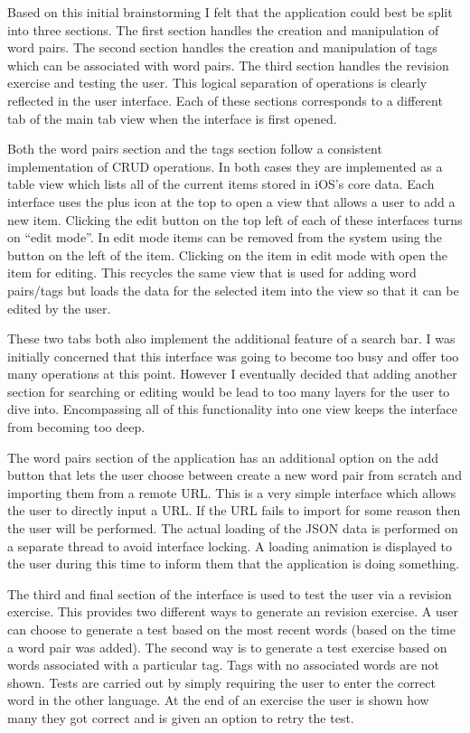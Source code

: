 \documentclass[paper=a4, fontsize=11pt]{scrartcl}	%
\numberwithin{equation}{section}															%
\numberwithin{figure}{section}																%
\numberwithin{table}{section}
\begin{document}
Based on this initial brainstorming I felt that the application could best be split into three sections. The first section handles the creation and manipulation of word pairs. The second section handles the creation and manipulation of tags which can be associated with word pairs. The third section handles the revision exercise and testing the user. This logical separation of operations is clearly reflected in the user interface. Each of these sections corresponds to a different tab of the main tab view when the interface is first opened.

Both the word pairs section and the tags section follow a consistent implementation of CRUD operations. In both cases they are implemented as a table view which lists all of the current items stored in iOS's core data. Each interface uses the plus icon at the top to open a view that allows a user to add a new item. Clicking the edit button on the top left of each of these interfaces turns on ``edit mode''. In edit mode items can be removed from the system using the button on the left of the item. Clicking on the item in edit mode with open the item for editing. This recycles the same view that is used for adding word pairs/tags but loads the data for the selected item into the view so that it can be edited by the user.

These two tabs both also implement the additional feature of a search bar. I was initially concerned that this interface was going to become too busy and offer too many operations at this point. However I eventually decided that adding another section for searching or editing would be lead to too many layers for the user to dive into. Encompassing all of this functionality into one view keeps the interface from becoming too deep.

The word pairs section of the application has an additional option on the add button that lets the user choose between create a new word pair from scratch and importing them from a remote URL. This is a very simple interface which allows the user to directly input a URL. If the URL fails to import for some reason then the user will be performed. The actual loading of the JSON data is performed on a separate thread to avoid interface locking. A loading animation is displayed to the user during this time to inform them that the application is doing something. 

The third and final section of the interface is used to test the user via a revision exercise. This provides two different ways to generate an revision exercise. A user can choose to generate a test based on the most recent words (based on the time a word pair was added). The second way is to generate a test exercise based on words associated with a particular tag. Tags with no associated words are not shown. Tests are carried out by simply requiring the user to enter the correct word in the other language. At the end of an exercise the user is shown how many they got correct and is given an option to retry the test. 
\end{document}
